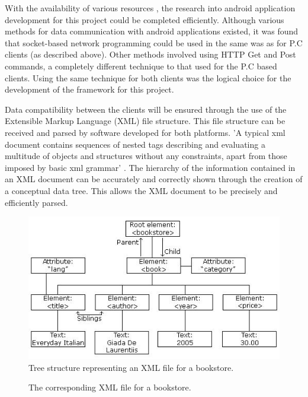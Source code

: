 \documentclass[a4paper,10pt]{report}
\begin{document}

With the availability of various resources \cite{androiddevelopers} \cite{markogargenta}, the research into android application development for this project could be completed efficiently. Although various methods for data communication with android applications existed, it was found that socket-based network programming could be used in the same was as for P.C clients (as described above). Other methods involved using HTTP Get and Post commands, a completely different technique to that used for the P.C based clients. Using the same technique for both clients was the logical choice for the development of the framework for this project.

Data compatibility between the clients will be ensured through the use of the Extensible Markup Language (XML) file structure. This file structure can be received and parsed by software developed for both platforms. 'A typical xml document contains sequences of nested tags describing and evaluating a multitude of objects and structures without any constraints, apart from those imposed by basic xml grammar' \cite{xmlbook}. The hierarchy of the information contained in an XML document can be accurately and correctly shown through the creation of a conceptual data tree. This allows the XML document to be precisely and efficiently parsed.

\begin{figure}[htb]
\centering
\includegraphics[scale=0.4]{images/nodetree.jpg}
\vspace{-10pt}
\caption{Tree structure representing an XML file for a bookstore.}
\vspace{-10pt}
\label{fig:exampleimg1}
\end{figure}

\begin{figure}[htb]
\centering

\vspace{-10pt}
\caption{The corresponding XML file for a bookstore.}
\label{fig:xml}
\end{figure}
\end{document}
